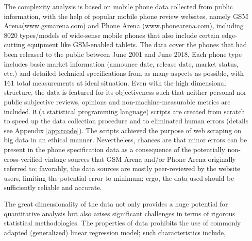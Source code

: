 \documentclass[utf8,english]{gradu3}
\begin{document}
The complexity analysis is based on mobile phone data collected from public information, with the help of popular mobile phone review websites, namely GSM Arena(www.gsmarena.com) and Phone Arena (www.phonearena.com), including 8020 types/models of wide-sense mobile phones that also include certain edge-cutting equipment like GSM-enabled tablets. The data cover the phones that had been released to the public between June 2001 and June 2018. Each phone type includes basic market information (announce date, release date, market status, etc.) and detailed technical specifications from as many aspects as possible, with 161 total measurements at ideal situation. Even with the high dimensional structure, the data is featured for its objectiveness such that neither personal nor public subjective reviews, opinions and non-machine-measurable metrics are included. \texttt{R} (a statistical programming language) scripts are created from scratch to speed up the data collection procedure and to eliminated human errors (details see Appendix \ref{app:rcode}). The scripts achieved the purpose of web scraping on big data in an ethical manner. Nevertheless, chances are that minor errors can be present in the phone specification data as a consequence of the potentially non-cross-verified vintage sources that GSM Arena and/or Phone Arena originally referred to; favorably, the data sources are mostly peer-reviewed by the website users, limiting the potential error to minimum; ergo, the data used should be sufficiently reliable and accurate.

The great dimensionality of the data not only provides a huge potential for quantitative analysis but also arises significant challenges in terms of rigorous statistical methodologies. The properties of data prohibits the use of commonly adapted (generalized) linear regression model; such characteristics include,
\end{document}
